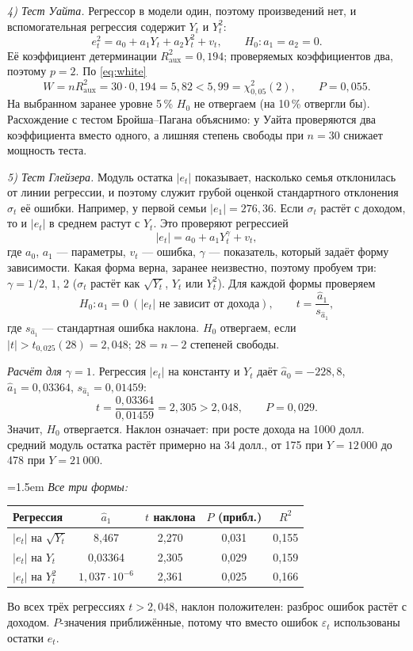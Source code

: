 \begin{solution}
\smallskip
\emph{4) Тест Уайта.} Регрессор в модели один, поэтому произведений нет, и
вспомогательная регрессия содержит $Y_t$ и $Y_t^2$:
\[
  e_t^2 = a_0 + a_1Y_t + a_2Y_t^2 + v_t ,
  \qquad
  H_0\colon a_1 = a_2 = 0 .
\]
Её коэффициент детерминации $R^2_{\text{aux}} = 0{,}194$; проверяемых
коэффициентов два, поэтому $p = 2$. По \eqref{eq:white}
\[
  W = nR^2_{\text{aux}} = 30\cdot 0{,}194 = 5{,}82 < 5{,}99 = \chi^2_{0{,}05}(2),
  \qquad P = 0{,}055 .
\]
На выбранном заранее уровне 5\,\% $H_0$ не отвергаем (на 10\,\% отвергли
бы). Расхождение с тестом Бройша--Пагана объяснимо: у Уайта проверяются два
коэффициента вместо одного, а лишняя степень свободы при $n = 30$ снижает
мощность теста.

\smallskip
\emph{5) Тест Глейзера.} Модуль остатка $|e_t|$ показывает, насколько
семья отклонилась от линии регрессии, и поэтому служит грубой оценкой
стандартного отклонения $\sigma_t$ её ошибки. Например, у первой семьи
$|e_1| = 276{,}36$. Если $\sigma_t$ растёт с доходом, то и $|e_t|$ в среднем
растут с $Y_t$. Это проверяют регрессией
\[
  |e_t| = a_0 + a_1Y_t^{\gamma} + v_t ,
\]
где $a_0$, $a_1$ — параметры, $v_t$ — ошибка, $\gamma$ — показатель, который
задаёт форму зависимости. Какая форма верна, заранее неизвестно, поэтому
пробуем три: $\gamma = 1/2$, $1$, $2$ ($\sigma_t$ растёт как $\sqrt{Y_t}$,
$Y_t$ или $Y_t^2$). Для каждой формы проверяем
\[
  H_0\colon a_1 = 0 \ (\text{$|e_t|$ не зависит от дохода}),
  \qquad
  t = \frac{\widehat a_1}{s_{\widehat a_1}} ,
\]
где $s_{\widehat a_1}$ — стандартная ошибка наклона. $H_0$ отвергаем, если
$|t| > t_{0{,}025}(28) = 2{,}048$; $28 = n - 2$ степеней свободы.

\smallskip
\emph{Расчёт для $\gamma = 1$.} Регрессия $|e_t|$ на константу и $Y_t$ даёт
$\widehat a_0 = -228{,}8$, $\widehat a_1 = 0{,}03364$,
$s_{\widehat a_1} = 0{,}01459$:
\[
  t = \frac{0{,}03364}{0{,}01459} = 2{,}305 > 2{,}048,
  \qquad P = 0{,}029 .
\]
Значит, $H_0$ отвергается. Наклон означает: при росте дохода на 1000 долл.
средний модуль остатка растёт примерно на 34 долл., от 175 при
$Y = 12\,000$ до 478 при $Y = 21\,000$.

\smallskip
\noindent\begin{minipage}{\linewidth}
\parindent=1.5em
\emph{Все три формы:}
\begin{center}
\begin{tabular}{lcccc}
\toprule
Регрессия & $\widehat a_1$ & $t$ наклона & $P$ (прибл.) & $R^2$ \\
\midrule
$|e_t|$ на $\sqrt{Y_t}$ & 8,467 & 2,270 & 0,031 & 0,155 \\
$|e_t|$ на $Y_t$ & 0,03364 & 2,305 & 0,029 & 0,159 \\
$|e_t|$ на $Y_t^2$ & $1{,}037\cdot 10^{-6}$ & 2,361 & 0,025 & 0,166 \\
\bottomrule
\end{tabular}
\end{center}
\end{minipage}
Во всех трёх регрессиях $t > 2{,}048$, наклон положителен: разброс ошибок
растёт с доходом. $P$-значения приближённые, потому что вместо ошибок
$\varepsilon_t$ использованы остатки $e_t$.


\end{solution}
